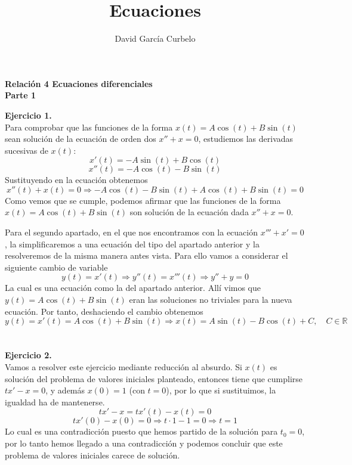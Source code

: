 \documentclass[fleqn]{article}
\author{David García Curbelo}
\title{Ecuaciones}
\def\R{\mathds{R}}
\begin{document}
    \setcounter{page}{1}
    \pagestyle{plain}

    \begin{center}
        {\large\bf{Relación 4 Ecuaciones diferenciales}} \\
        \bf{Parte 1}\\
        
    \end{center}

    \textbf{Ejercicio 1.} \\

    Para comprobar que las funciones de la forma $ x(t) = A\cos(t) + B\sin(t)$ sean solución de la ecuación de orden dos $x'' + x = 0$, estudiemos
    las derivadas sucesivas de $x(t)$:
    $$x'(t)= - A\sin(t) + B\cos(t)$$
    $$ x''(t) = -A\cos(t) - B\sin(t)$$
    Sustituyendo en la ecuación obtenemos
    $$x''(t) + x(t) = 0 \Rightarrow -A\cos(t) - B\sin(t) + A\cos(t) + B\sin(t) = 0$$
    Como vemos que se cumple, podemos afirmar que las funciones de la forma $ x(t) = A\cos(t) + B\sin(t)$ son solución de la ecuación dada $x'' + x = 0$.

    Para el segundo apartado, en el que nos encontramos con la ecuación $x'''+ x' = 0$, la simplificaremos a una ecuación del tipo del apartado anterior
    y la resolveremos de la misma manera antes vista. Para ello vamos a considerar el siguiente cambio de variable
    $$y(t)=x'(t) \Rightarrow y''(t)=x'''(t) \Rightarrow y'' + y = 0$$ 
    La cual es una ecuación como la del apartado anterior. Allí vimos que $y(t)= A\cos(t) + B\sin(t)$ eran las soluciones no triviales para la nueva ecuación.
    Por tanto, deshaciendo el cambio obtenemos
    $$y(t)=x'(t)= A\cos(t) + B\sin(t) \Rightarrow x(t) = A\sin(t)-B\cos(t) + C, \quad C \in \R$$ \\ \\

    \textbf{Ejercicio 2.} \\
    
    Vamos a resolver este ejercicio mediante reducción al absurdo. Si $x(t)$ es solución del problema de valores iniciales planteado, entonces
    tiene que cumplirse $tx'-x=0$, y además $x(0)=1$ (con $t=0$), por lo que si sustituimos, la igualdad ha de mantenerse.
    $$tx'-x=tx'(t)-x(t)=0$$
    $$tx'(0)-x(0)=0 \Rightarrow t\cdot1 - 1 = 0 \Rightarrow t=1$$
    Lo cual es una contradicción puesto que hemos partido de la solución para $t_0=0$, por lo tanto hemos llegado a una contradicción y podemos
    concluir que este problema de valores iniciales carece de solución. \\ \\
\end{document}
